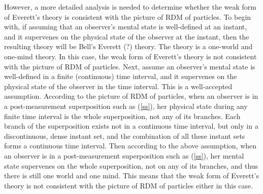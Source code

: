 However, a more detailed analysis is needed to determine whether the weak form of Everett's theory is consistent with the picture of RDM of particles.
To begin with, if assuming that an observer's mental state is well-defined at an instant, and it supervenes on the  physical state of the observer at the instant, then the resulting theory will be Bell's Everett (?) theory. The theory is a one-world and one-mind theory. In this case, the weak form of Everett's theory is not consistent with the picture of RDM of particles.
Next, assume an observer's mental state is well-defined in a finite (continuous) time interval, and it supervenes on the physical state of the observer in the time interval. This is a well-accepted assumption. 
According to the picture of RDM of particles, when an observer is in a post-measurement superposition such as (\ref{ss}),  her physical state during any finite time interval is the whole superposition, not any of its branches.
Each branch of the superposition exists not in a continuous time interval, but only in a discontinuous, dense instant set, and the combination of all these instant sets forms a continuous time interval. 
Then according to the above assumption, when an observer is in a post-measurement superposition such as (\ref{ss}), 
her mental state supervenes on the whole superposition, not on any of its branches, and thus there is still one world and one mind. This means that the weak form of Everett's theory is not consistent with the picture of RDM of particles either in this case.

